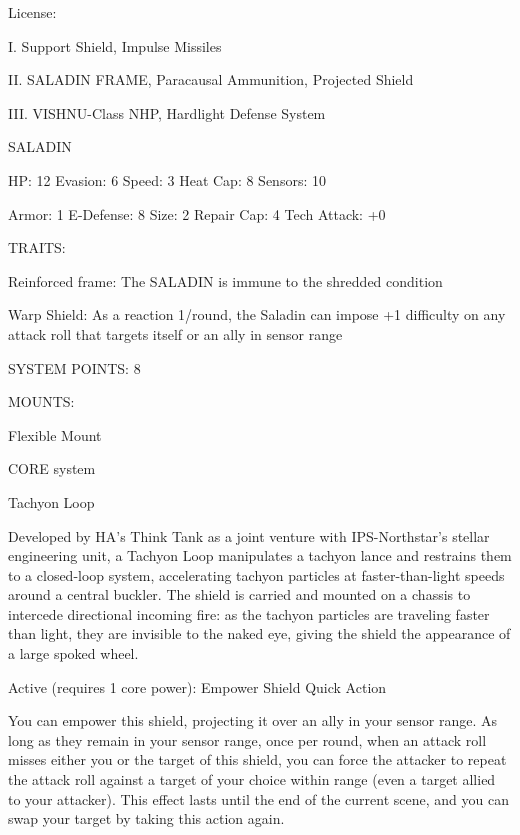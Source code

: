                                                    License:
 
I. Support Shield, Impulse Missiles
 
II. SALADIN FRAME, Paracausal Ammunition, Projected Shield
 
III. VISHNU-Class NHP, Hardlight Defense System
 

                                                 SALADIN 

 HP: 12         Evasion: 6                            Speed: 3            Heat Cap: 8        Sensors: 10 

 Armor: 1       E-Defense: 8                          Size: 2             Repair Cap: 4      Tech Attack:  
                                                                                             +0 

                                                   TRAITS: 

 Reinforced frame: The SALADIN is immune to the shredded condition
 
 Warp Shield: As a reaction 1/round, the Saladin can impose +1 difficulty on any attack roll that targets  
 itself or an ally in sensor range  

                                             SYSTEM POINTS: 8 

                                                  MOUNTS: 

 Flexible Mount 

                                                CORE system 

                                                                                                             


                                                  Tachyon Loop
 
 Developed by HA’s Think Tank as a joint venture with IPS-Northstar’s stellar engineering unit, a Tachyon  
 Loop manipulates a tachyon lance and restrains them to a closed-loop system, accelerating tachyon  
 particles at faster-than-light speeds around a central buckler. The shield is carried and mounted on a  
 chassis to intercede directional incoming fire: as the tachyon particles are traveling faster than light, they  
 are invisible to the naked eye, giving the shield the appearance of a large spoked wheel.   

 Active (requires 1 core power): Empower Shield  
 Quick Action
 
 You can empower this shield, projecting it over an ally in your sensor range. As long as they remain in  
 your sensor range, once per round, when an attack roll misses either you or the target of this shield,  
 you can force the attacker to repeat the attack roll against a target of your choice within range (even a  
 target allied to your attacker). This effect lasts until the end of the current scene, and you can swap  
 your target by taking this action again. 

